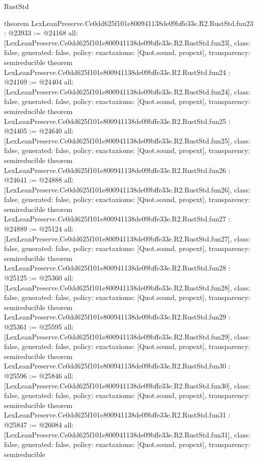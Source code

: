 \begin{lexlean}{RustStd}
\begin{coremodule}
{}
theorem LexLeanPreserve.Ce0dd625f101e800941138de09bffe33e.R2.RustStd.fun23 : @23933 := @24168 {
  all: [LexLeanPreserve.Ce0dd625f101e800941138de09bffe33e.R2.RustStd.fun23],
  class: false,
  generated: false,
  policy: exact{axioms: [Quot.sound, propext]},
  transparency: semireducible
}
theorem LexLeanPreserve.Ce0dd625f101e800941138de09bffe33e.R2.RustStd.fun24 : @24169 := @24404 {
  all: [LexLeanPreserve.Ce0dd625f101e800941138de09bffe33e.R2.RustStd.fun24],
  class: false,
  generated: false,
  policy: exact{axioms: [Quot.sound, propext]},
  transparency: semireducible
}
theorem LexLeanPreserve.Ce0dd625f101e800941138de09bffe33e.R2.RustStd.fun25 : @24405 := @24640 {
  all: [LexLeanPreserve.Ce0dd625f101e800941138de09bffe33e.R2.RustStd.fun25],
  class: false,
  generated: false,
  policy: exact{axioms: [Quot.sound, propext]},
  transparency: semireducible
}
theorem LexLeanPreserve.Ce0dd625f101e800941138de09bffe33e.R2.RustStd.fun26 : @24641 := @24888 {
  all: [LexLeanPreserve.Ce0dd625f101e800941138de09bffe33e.R2.RustStd.fun26],
  class: false,
  generated: false,
  policy: exact{axioms: [Quot.sound, propext]},
  transparency: semireducible
}
theorem LexLeanPreserve.Ce0dd625f101e800941138de09bffe33e.R2.RustStd.fun27 : @24889 := @25124 {
  all: [LexLeanPreserve.Ce0dd625f101e800941138de09bffe33e.R2.RustStd.fun27],
  class: false,
  generated: false,
  policy: exact{axioms: [Quot.sound, propext]},
  transparency: semireducible
}
theorem LexLeanPreserve.Ce0dd625f101e800941138de09bffe33e.R2.RustStd.fun28 : @25125 := @25360 {
  all: [LexLeanPreserve.Ce0dd625f101e800941138de09bffe33e.R2.RustStd.fun28],
  class: false,
  generated: false,
  policy: exact{axioms: [Quot.sound, propext]},
  transparency: semireducible
}
theorem LexLeanPreserve.Ce0dd625f101e800941138de09bffe33e.R2.RustStd.fun29 : @25361 := @25595 {
  all: [LexLeanPreserve.Ce0dd625f101e800941138de09bffe33e.R2.RustStd.fun29],
  class: false,
  generated: false,
  policy: exact{axioms: [Quot.sound, propext]},
  transparency: semireducible
}
theorem LexLeanPreserve.Ce0dd625f101e800941138de09bffe33e.R2.RustStd.fun30 : @25596 := @25846 {
  all: [LexLeanPreserve.Ce0dd625f101e800941138de09bffe33e.R2.RustStd.fun30],
  class: false,
  generated: false,
  policy: exact{axioms: [Quot.sound, propext]},
  transparency: semireducible
}
theorem LexLeanPreserve.Ce0dd625f101e800941138de09bffe33e.R2.RustStd.fun31 : @25847 := @26084 {
  all: [LexLeanPreserve.Ce0dd625f101e800941138de09bffe33e.R2.RustStd.fun31],
  class: false,
  generated: false,
  policy: exact{axioms: [Quot.sound, propext]},
  transparency: semireducible
}
\end{coremodule}
\end{lexlean}
